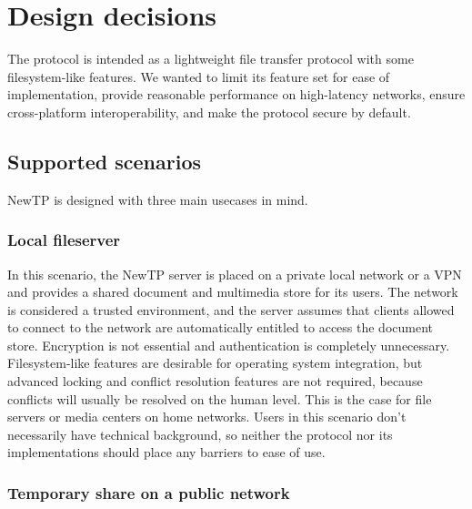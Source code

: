 
\section{Design decisions}

The protocol is intended as a lightweight file transfer protocol with some filesystem-like features. We wanted
to limit its feature set for ease of implementation, provide reasonable performance on high-latency networks,
ensure cross-platform interoperability, and make the protocol secure by default.

%

\subsection{Supported scenarios}

NewTP is designed with three main usecases in mind.

%

\subsubsection{Local fileserver}

In this scenario, the NewTP server is placed on a private local network or a VPN and provides a shared
document and multimedia store for its users. The network is considered a trusted environment, and the server
assumes that clients allowed to connect to the network are automatically entitled to access the document
store.  Encryption is not essential and authentication is completely unnecessary. Filesystem-like features are
desirable for operating system integration, but advanced locking and conflict resolution features are not
required, because conflicts will usually be resolved on the human level. This is the case for file servers or
media centers on home networks. Users in this scenario don't necessarily have technical background, so neither
the protocol nor its implementations should place any barriers to ease of use.

%

\subsubsection{Temporary share on a public network}

